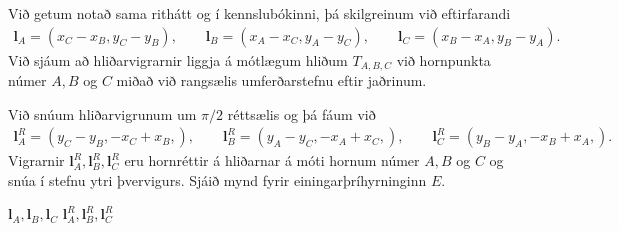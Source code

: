 \documentclass[a4paper,10pt,icelandic]{sphinxmanual}
\begin{document}
Við getum notað sama rithátt og í kennslubókinni, þá skilgreinum við eftirfarandi 
\begin{equation*}
\begin{split}{\mathbf l}_A=(x_C-x_B,y_C-y_B), \qquad
{\mathbf l}_B=(x_A-x_C,y_A-y_C), \qquad
{\mathbf l}_C=(x_B-x_A,y_B-y_A).\end{split}
\end{equation*}
Við sjáum að hliðarvigrarnir liggja á mótlægum hliðum \(T_{A,B,C}\) við hornpunkta númer \(A, B\) og \(C\) miðað við rangsælis umferðarstefnu eftir jaðrinum.

Við snúum hliðarvigrunum um \(\pi/2\) réttsælis og þá fáum við
\begin{equation*}
\begin{split}{\mathbf l}_A^R=(y_C-y_B,-x_C+x_B,), \qquad
{\mathbf l}_B^R=(y_A-y_C,-x_A+x_C,), \qquad
{\mathbf l}_C^R=(y_B-y_A,-x_B+x_A,).\end{split}
\end{equation*}
Vigrarnir \({\mathbf l}_A^R, {\mathbf l}_B^R, {\mathbf l}_C^R\) eru hornréttir á hliðarnar á móti hornum númer \(A, B\) og \(C\) og snúa í stefnu ytri þvervigurs.
Sjáið mynd fyrir einingarþríhyrninginn \(E\).


  \({\mathbf l}_A, {\mathbf l}_B, {\mathbf l}_C\)   \({\mathbf l}_A^R, {\mathbf l}_B^R, {\mathbf l}_C^R\)  
\end{document}
